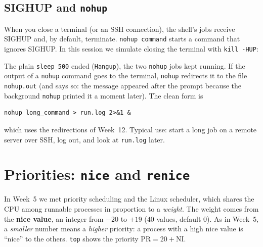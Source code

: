 \documentclass[11pt,a4paper]{article}
\newcommand{\term}[1]{\textbf{\color{mintdeep}#1}}
\newcommand{\cmd}[1]{\texttt{#1}}
\begin{document}
\subsection{SIGHUP and \texttt{nohup}}
\label{sec:nohup}

When you close a terminal (or an SSH connection), the shell's jobs receive SIGHUP and, by default, terminate. \cmd{nohup command} starts a command that ignores SIGHUP. In this session we simulate closing the terminal with \cmd{kill -HUP}:



The plain \cmd{sleep 500} ended (\texttt{Hangup}), the two \cmd{nohup} jobs kept running. If the output of a \cmd{nohup} command goes to the terminal, \cmd{nohup} redirects it to the file \texttt{nohup.out} (and says so: the message appeared after the prompt because the background \cmd{nohup} printed it a moment later). The clean form is
\begin{lstlisting}[style=term]
nohup long_command > run.log 2>&1 &
\end{lstlisting}
which uses the redirections of Week~12. Typical use: start a long job on a remote server over SSH, log out, and look at \texttt{run.log} later.

\section{Priorities: \texttt{nice} and \texttt{renice}}
\label{sec:nice}

In Week~5 we met priority scheduling and the Linux scheduler, which shares the CPU among runnable processes in proportion to a \emph{weight}. The weight comes from the \term{nice value}, an integer from $-20$ to $+19$ ($40$ values, default $0$). As in Week~5, a \emph{smaller} number means a \emph{higher} priority: a process with a high nice value is ``nice'' to the others. \cmd{top} shows the priority $\text{PR} = 20 + \text{NI}$.




\end{document}
